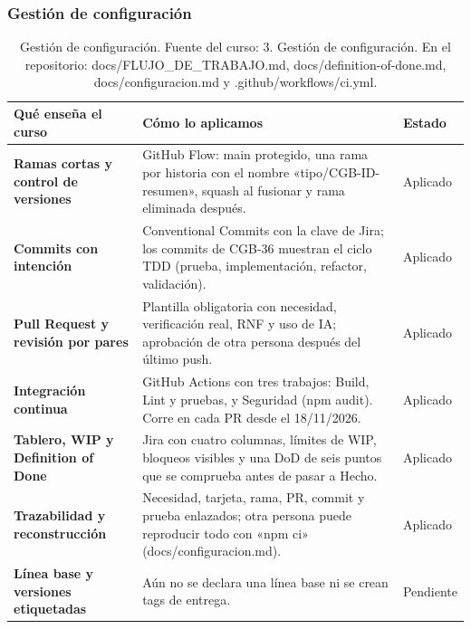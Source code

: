 \documentclass[11pt,a4paper]{article}
\begin{document}
\subsubsection*{Gestión de configuración}
\begin{table}[H]
\centering
\scriptsize
\renewcommand{\arraystretch}{1.2}
\begin{tabularx}{\linewidth}{|>{\raggedright\arraybackslash}p{3.6cm}|>{\raggedright\arraybackslash}X|>{\centering\arraybackslash}p{1.6cm}|}
\hline
\rowcolor{gray!15}
\textbf{Qué enseña el curso} & \textbf{Cómo lo aplicamos} & \textbf{Estado} \\
\hline
\textbf{Ramas cortas y control de versiones} & GitHub Flow: main protegido, una rama por historia con el nombre «tipo/CGB-ID-resumen», squash al fusionar y rama eliminada después. & Aplicado \\
\hline
\textbf{Commits con intención} & Conventional Commits con la clave de Jira; los commits de CGB-36 muestran el ciclo TDD (prueba, implementación, refactor, validación). & Aplicado \\
\hline
\textbf{Pull Request y revisión por pares} & Plantilla obligatoria con necesidad, verificación real, RNF y uso de IA; aprobación de otra persona después del último push. & Aplicado \\
\hline
\textbf{Integración continua} & GitHub Actions con tres trabajos: Build, Lint y pruebas, y Seguridad (npm audit). Corre en cada PR desde el 18/11/2026. & Aplicado \\
\hline
\textbf{Tablero, WIP y Definition of Done} & Jira con cuatro columnas, límites de WIP, bloqueos visibles y una DoD de seis puntos que se comprueba antes de pasar a Hecho. & Aplicado \\
\hline
\textbf{Trazabilidad y reconstrucción} & Necesidad, tarjeta, rama, PR, commit y prueba enlazados; otra persona puede reproducir todo con «npm ci» (docs/configuracion.md). & Aplicado \\
\hline
\textbf{Línea base y versiones etiquetadas} & Aún no se declara una línea base ni se crean tags de entrega. & Pendiente \\
\hline
\end{tabularx}
\caption{Gestión de configuración. Fuente del curso: 3. Gestión de configuración. En el repositorio: docs/FLUJO\_DE\_TRABAJO.md, docs/definition-of-done.md, docs/configuracion.md y .github/workflows/ci.yml.}
\end{table}
\end{document}
